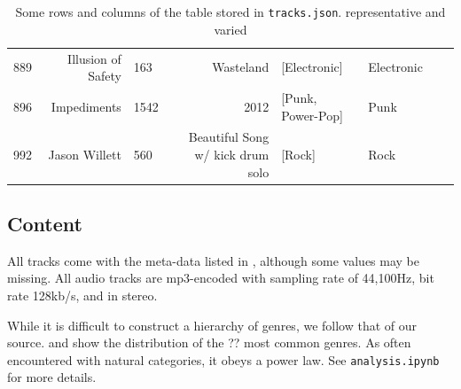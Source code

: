 \documentclass{article}
\newcommand{\todo}[1]{{\color{red} #1 }}
\begin{document}
\begin{table}
\begin{tabular}{lrlrllll}
		 889 &                                 Illusion of Safety &         163 &                                          Wasteland &                                       [Electronic] &           Electronic  \\
		 896 &                                        Impediments &        1542 &                                               2012 &                                  [Punk, Power-Pop] &                 Punk  \\
			  992 &                                      Jason Willett &         560 &                   Beautiful Song w/ kick drum solo &                                             [Rock] &                 Rock  \\
	\bottomrule
	\end{tabular}
	\caption{Some rows and columns of the table stored in \texttt{tracks.json}. \todo{representative and varied}}
	\label{tab:tracks}
\end{table}

\subsection{Content} \label{sec:content}

All tracks come with the meta-data listed in , although some values may be missing.
All audio tracks are mp3-encoded with sampling rate of 44,100Hz, bit rate 128kb/s, and in stereo. 


While it is difficult to construct a hierarchy of genres, we follow that of our source.  and  show the distribution of the \todo{??} most common genres. As often encountered with natural categories, it obeys a power law.
See \texttt{analysis.ipynb} for more details.

\end{document}
